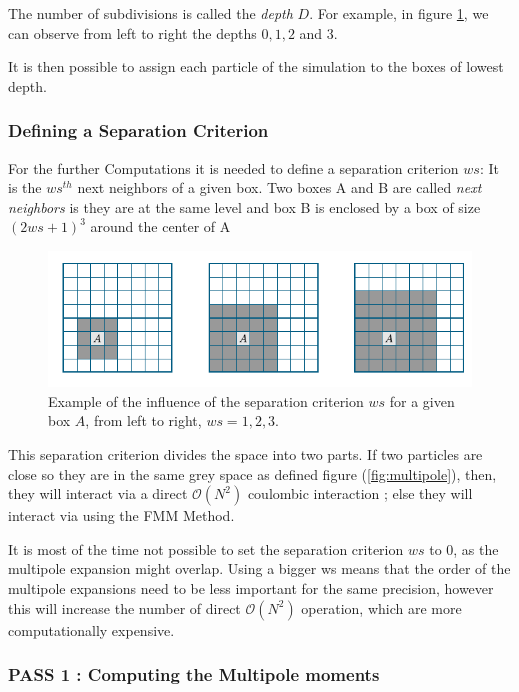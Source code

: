 \documentclass[10pt,twoside,a4paper]{report}
\begin{document}
    
    The number of subdivisions is called the \textit{depth} $D$. For example, in figure \ref{fig:depth}, we can observe from left to right the depths $0,1,2$ and $3$.
    
    It is then possible to assign each particle of the simulation to the boxes of lowest depth.
    
	\subsubsection{Defining a Separation Criterion}
	
	For the further Computations it is needed to define a separation criterion $ws$: It is the $ws^{th}$ next neighbors of a given box. Two boxes A and B are called \textit{next neighbors} is they are at the same level and box B is enclosed by a box of size $(2 ws + 1)^3$ around the center of A 
	
	
	
	
	\begin{figure}[H]
    \includegraphics[scale=0.7]{separation}    
    \centering 
    \caption{Example of the influence of the separation criterion $ws$ for a given box $A$, from left to right, $ws = 1,2,3$.}    
    \label{fig:depth}
     \end{figure}
	
		This separation criterion divides the space into two parts. If two particles are close so they are in the same grey space as defined figure (\ref{fig:multipole}), then, they will interact via a direct $\mathcal{O}(N^2)$ coulombic interaction ; else they will interact via using the FMM Method.
	
	It is most of the time not possible to set the separation criterion $ws$ to 0, as the multipole expansion might overlap. Using a bigger ws means that the order of the multipole expansions need to be less important for the same precision, however this will increase the number of direct $\mathcal{O}(N^2)$ operation, which are  more computationally expensive.       
    
    
    \subsubsection{PASS 1 : Computing the Multipole moments}
    
\end{document}
